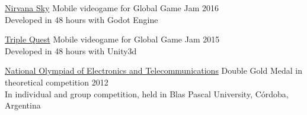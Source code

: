 \documentclass[10pt,a4paper]{article}
\begin{document}
\pagebreak

\spacedhrule{0.8em}{-0.4em}


\vspace{0.2em}
\headedsection
    {\href{http://globalgamejam.org/2016/games/nirvana-sky}{Nirvana Sky}}
    {\textsc{}}{
    \headedsubsection
        {Mobile videogame for Global Game Jam}
        {2016}
        {\\Developed in 48 hours with Godot Engine}
}

\vspace{0.2em}
\headedsection
    {\href{http://globalgamejam.org/2015/games/triple-quest}{Triple Quest}}
    {\textsc{}}{
    \headedsubsection
        {Mobile videogame for Global Game Jam}
        {2015}
        {\\Developed in 48 hours with Unity3d}
}

\vspace{0.2em}
\headedsection
    {\href{}{National Olympiad of Electronics and Telecommunications}}
    {\textsc{}}{
    \headedsubsection
        {Double Gold Medal in theoretical competition}
        {2012}
        {\\In individual and group competition, held in Blas Pascal University, Córdoba, Argentina}
}
\end{document}
